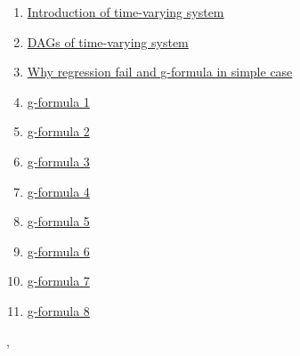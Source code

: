 \documentclass[11pt]{article}
\renewcommand{\today}{\shortmonthname[\the\month] \the \day,  \the\year}
\begin{document}
\begin{multicols}{2}
	\begin{enumerate}
		\item \href{https://mp.weixin.qq.com/s/RmfZv7W4_e6vWohTkAYGjg}{Introduction of time-varying system}	%
		\item \href{https://mp.weixin.qq.com/s/YJnn2hG_jsK-7BxGfgobTQ}{DAGs of time-varying system}	%
		\item \href{https://mp.weixin.qq.com/s/W7W-MO-VCpU92tYF73aqRQ}{\small Why regression fail and g-formula in simple case}	%
		\item \href{https://mp.weixin.qq.com/s/B3rAP8NRpz60hfU1PpgJ4A}{g-formula 1}	%
		\item \href{https://mp.weixin.qq.com/s/1UlKBo28nTVETec53cIn3Q}{g-formula 2}	%
		\item \href{https://mp.weixin.qq.com/s/nuRefZw7A7BsL10giGz__w}{g-formula 3}	%
		\item \href{https://mp.weixin.qq.com/s/mJsF27jYbdXUu9gAlkhIFw}{g-formula 4}	%
		\item \href{https://mp.weixin.qq.com/s/oe3ygsTkzY3s9sw3CgVDXw}{g-formula 5}	%
		\item \href{https://mp.weixin.qq.com/s/GOce-aNrvnZz-zpeZJxTrg}{g-formula 6}	%
		\item \href{https://mp.weixin.qq.com/s/ne_rbSLWPXV5hoGrySikrw}{g-formula 7}	%
		\item \href{https://mp.weixin.qq.com/s/FUYsX3IZQLBjW-7yoI35Lw}{g-formula 8}	%
	\end{enumerate}
\end{multicols}




%
\begin{flushright}
	\tiny \today 
\end{flushright}
\end{document}
